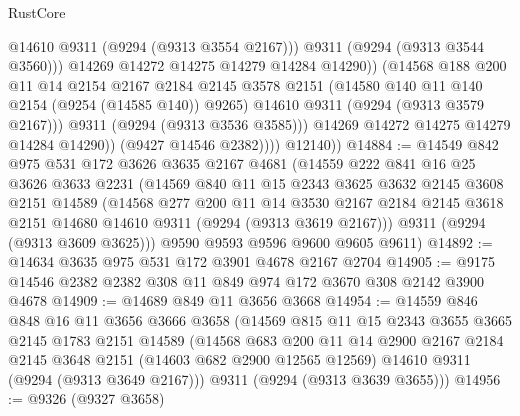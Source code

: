 \begin{lexlean}{RustCore}
\begin{coremodule}
                            @14610
                            @9311
                            (@9294 (@9313 @3554 @2167)))
                          @9311
                          (@9294 (@9313 @3544 @3560)))
                        @14269
                        @14272
                        @14275
                        @14279
                        @14284
                        @14290))
                    (@14568
                      @188
                      @200
                      @11
                      @14
                      @2154
                      @2167
                      @2184
                      @2145
                      @3578
                      @2151
                      (@14580 @140 @11 @140 @2154 (@9254 (@14585 @140)) @9265)
                      @14610
                      @9311
                      (@9294 (@9313 @3579 @2167)))
                    @9311
                    (@9294 (@9313 @3536 @3585)))
                  @14269
                  @14272
                  @14275
                  @14279
                  @14284
                  @14290))
              (@9427 @14546 @2382))))
        @12140))
@14884 := @14549
    @842
    @975
    @531
    @172
    @3626
    @3635
    @2167
    @4681
    (@14559
      @222
      @841
      @16
      @25
      @3626
      @3633
      @2231
      (@14569
        @840
        @11
        @15
        @2343
        @3625
        @3632
        @2145
        @3608
        @2151
        @14589
        (@14568
          @277
          @200
          @11
          @14
          @3530
          @2167
          @2184
          @2145
          @3618
          @2151
          @14680
          @14610
          @9311
          (@9294 (@9313 @3619 @2167)))
        @9311
        (@9294 (@9313 @3609 @3625)))
      @9590
      @9593
      @9596
      @9600
      @9605
      @9611)
@14892 := @14634 @3635 @975 @531 @172 @3901 @4678 @2167 @2704
@14905 := @9175 @14546 @2382 @2382 @308 @11 @849 @974 @172 @3670 @308 @2142 @3900 @4678
@14909 := @14689 @849 @11 @3656 @3668
@14954 := @14559
    @846
    @848
    @16
    @11
    @3656
    @3666
    @3658
    (@14569
      @815
      @11
      @15
      @2343
      @3655
      @3665
      @2145
      @1783
      @2151
      @14589
      (@14568
        @683
        @200
        @11
        @14
        @2900
        @2167
        @2184
        @2145
        @3648
        @2151
        (@14603 @682 @2900 @12565 @12569)
        @14610
        @9311
        (@9294 (@9313 @3649 @2167)))
      @9311
      (@9294 (@9313 @3639 @3655)))
@14956 := @9326 (@9327 @3658)

\end{coremodule}
\end{lexlean}
